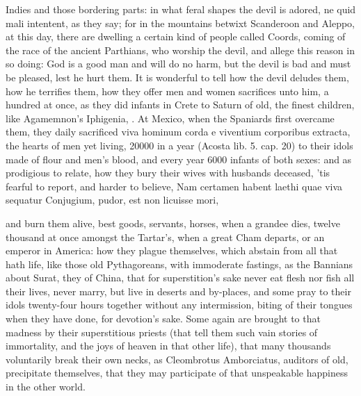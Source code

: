 {Indies and those bordering parts: in what feral shapes the
devil is adored, ne quid mali intentent, as they say; for in the
mountains betwixt Scanderoon and Aleppo, at this day, there are
dwelling a certain kind of people called Coords, coming of the race of
the ancient Parthians, who worship the devil, and allege this reason in
so doing: God is a good man and will do no harm, but the devil is bad
and must be pleased, lest he hurt them. It is wonderful to tell how the
devil deludes them, how he terrifies them, how they offer men and women
sacrifices unto him, a hundred at once, as they did infants in Crete to
Saturn of old, the finest children, like Agamemnon's Iphigenia, \etc{}. At
Mexico, when the Spaniards first overcame them, they daily
sacrificed viva hominum corda e viventium corporibus extracta, the
hearts of men yet living, 20\thinspace{}000 in a year (Acosta lib. 5. cap. 20) to
their idols made of flour and men's blood, and every year 6000 infants
of both sexes: and as prodigious to relate, how they bury their
wives with husbands deceased, 'tis fearful to report, and harder to
believe,
Nam certamen habent laethi quae viva sequatur
Conjugium, pudor, est non licuisse mori,

and burn them alive, best goods, servants, horses, when a grandee dies,
twelve thousand at once amongst the Tartar's, when a great Cham
departs, or an emperor in America: how they plague themselves, which
abstain from all that hath life, like those old Pythagoreans, with
immoderate fastings, as the Bannians about Surat, they of China,
that for superstition's sake never eat flesh nor fish all their lives,
never marry, but live in deserts and by-places, and some pray to their
idols twenty-four hours together without any intermission, biting of
their tongues when they have done, for devotion's sake. Some again are
brought to that madness by their superstitious priests (that tell them
such vain stories of immortality, and the joys of heaven in that other
life),  that many thousands voluntarily break their own necks, as
Cleombrotus Amborciatus, auditors of old, precipitate themselves, that
they may participate of that unspeakable happiness in the other world.

}
